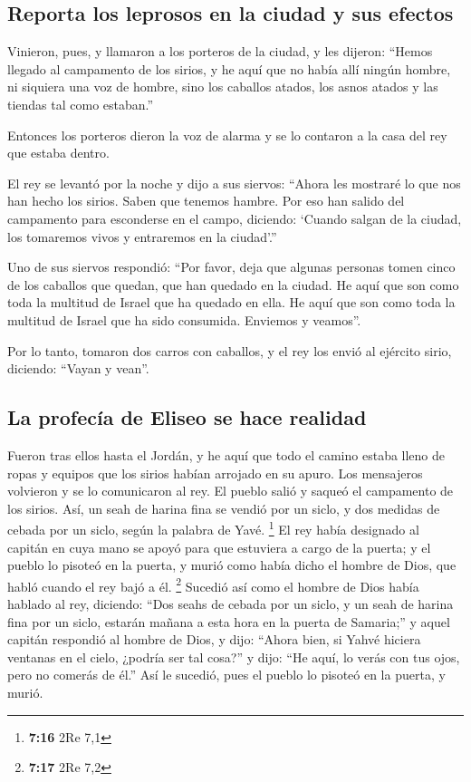 \hypertarget{reporta-los-leprosos-en-la-ciudad-y-sus-efectos}{%
\subsection{Reporta los leprosos en la ciudad y sus
efectos}\label{reporta-los-leprosos-en-la-ciudad-y-sus-efectos}}

 Vinieron, pues, y llamaron a los porteros de la ciudad,
y les dijeron: ``Hemos llegado al campamento de los sirios, y he aquí
que no había allí ningún hombre, ni siquiera una voz de hombre, sino los
caballos atados, los asnos atados y las tiendas tal como estaban.''

 Entonces los porteros dieron la voz de alarma y se lo
contaron a la casa del rey que estaba dentro.

 El rey se levantó por la noche y dijo a sus siervos:
``Ahora les mostraré lo que nos han hecho los sirios. Saben que tenemos
hambre. Por eso han salido del campamento para esconderse en el campo,
diciendo: `Cuando salgan de la ciudad, los tomaremos vivos y entraremos
en la ciudad'.''

 Uno de sus siervos respondió: ``Por favor, deja que
algunas personas tomen cinco de los caballos que quedan, que han quedado
en la ciudad. He aquí que son como toda la multitud de Israel que ha
quedado en ella. He aquí que son como toda la multitud de Israel que ha
sido consumida. Enviemos y veamos''.

 Por lo tanto, tomaron dos carros con caballos, y el rey
los envió al ejército sirio, diciendo: ``Vayan y vean''.

\hypertarget{la-profecuxeda-de-eliseo-se-hace-realidad}{%
\subsection{La profecía de Eliseo se hace
realidad}\label{la-profecuxeda-de-eliseo-se-hace-realidad}}

 Fueron tras ellos hasta el Jordán, y he aquí que todo el
camino estaba lleno de ropas y equipos que los sirios habían arrojado en
su apuro. Los mensajeros volvieron y se lo comunicaron al rey.
 El pueblo salió y saqueó el campamento de los sirios.
Así, un seah de harina fina se vendió por un siclo, y dos medidas de
cebada por un siclo, según la palabra de Yavé. \footnote{\textbf{7:16}
  2Re 7,1}  El rey había designado al capitán en cuya
mano se apoyó para que estuviera a cargo de la puerta; y el pueblo lo
pisoteó en la puerta, y murió como había dicho el hombre de Dios, que
habló cuando el rey bajó a él. \footnote{\textbf{7:17} 2Re 7,2}
 Sucedió así como el hombre de Dios había hablado al rey,
diciendo: ``Dos seahs de cebada por un siclo, y un seah de harina fina
por un siclo, estarán mañana a esta hora en la puerta de Samaria;''
 y aquel capitán respondió al hombre de Dios, y dijo:
``Ahora bien, si Yahvé hiciera ventanas en el cielo, ¿podría ser tal
cosa?'' y dijo: ``He aquí, lo verás con tus ojos, pero no comerás de
él.''  Así le sucedió, pues el pueblo lo pisoteó en la
puerta, y murió.

